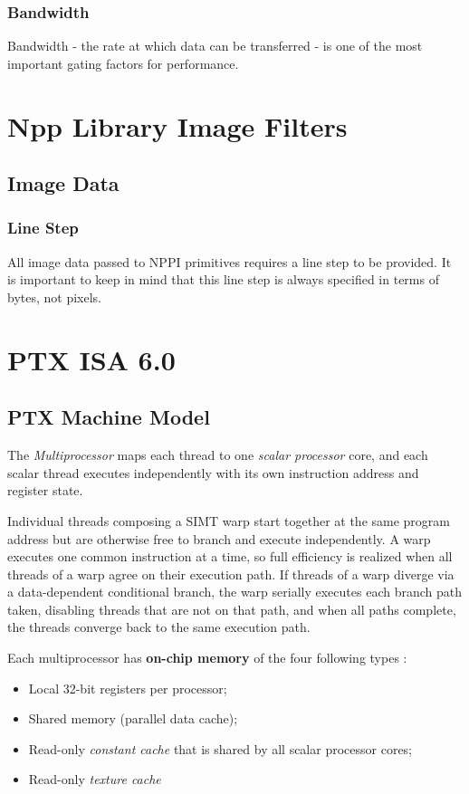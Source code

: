 \subsubsection{Bandwidth}
Bandwidth - the rate at which data can be transferred - is one of the most important gating factors for performance.


\section{Npp Library Image Filters}
\subsection{Image Data}
\subsubsection{Line Step}
All image data passed to NPPI primitives requires a line step to be provided. It is important to keep in mind that this line step is always specified in terms of bytes, not pixels.

\section{PTX ISA 6.0}
\subsection{PTX Machine Model}
The \textit{Multiprocessor} maps each thread to one \textit{scalar processor} core, and each scalar thread executes independently with its own instruction address and register state.

Individual threads composing a SIMT warp start together at the same program address but are otherwise free to branch and execute independently. A warp executes one common instruction at a time, so full efficiency is realized when all threads of a warp agree on their execution path. If threads of a warp diverge via a data-dependent
conditional branch, the warp serially executes each branch path taken, disabling threads that are not on that path, and when all paths complete, the threads converge back to the same execution path. 

Each multiprocessor has \textbf{on-chip memory} of the four following types : 
\begin{itemize}
\item Local 32-bit registers per processor;
\item Shared memory (parallel data cache);
\item Read-only \textit{constant cache} that is shared by all scalar processor cores;
\item Read-only \textit{texture cache} 
\end{itemize}


